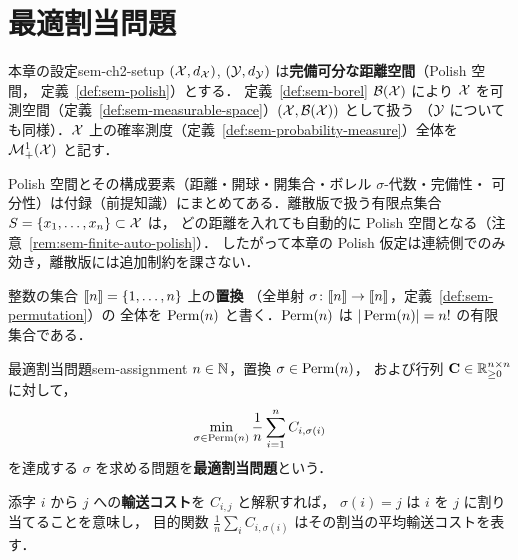 \chapter{最適割当問題}
\label{ch:sem-assignment-chapter}

\begin{remark}{本章の設定}{sem-ch2-setup}
  $(\mathcal{X}, d_{\mathcal{X}})$, $(\mathcal{Y}, d_{\mathcal{Y}})$ は\textbf{完備可分な距離空間}（Polish 空間，
  定義~\ref{def:sem-polish}）とする．
  定義~\ref{def:sem-borel} $\mathcal{B}(\mathcal{X})$ により
  $\mathcal{X}$ を可測空間（定義~\ref{def:sem-measurable-space}）$(\mathcal{X}, \mathcal{B}(\mathcal{X}))$ として扱う
  （$\mathcal{Y}$ についても同様）．$\mathcal{X}$ 上の確率測度（定義~\ref{def:sem-probability-measure}）全体を $\mathcal{M}_+^1(\mathcal{X})$ と記す．

  Polish 空間とその構成要素（距離・開球・開集合・ボレル $\sigma$-代数・完備性・
  可分性）は付録（前提知識）にまとめてある．離散版で扱う有限点集合 $S = \{x_1, \ldots, x_n\} \subset \mathcal{X}$ は，
  どの距離を入れても自動的に Polish 空間となる（注意~\ref{rem:sem-finite-auto-polish}）．
  したがって本章の Polish 仮定は連続側でのみ効き，離散版には追加制約を課さない．
\end{remark}

整数の集合 $\llbracket n \rrbracket = \{1, \ldots, n\}$ 上の\textbf{置換}
（全単射 $\sigma \colon \llbracket n \rrbracket \to \llbracket n \rrbracket$，定義~\ref{def:sem-permutation}）の
全体を $\operatorname{Perm}(n)$ と書く．$\operatorname{Perm}(n)$ は $|\operatorname{Perm}(n)| = n!$ の有限集合である．

\begin{definition}{最適割当問題}{sem-assignment}
  $n \in \mathbb{N}$，置換 $\sigma \in \operatorname{Perm}(n)$，
  および行列 $\mathbf{C} \in \mathbb{R}_{\geq 0}^{n \times n}$ に対して，
  \[
    \min_{\sigma \in \operatorname{Perm}(n)} \frac{1}{n} \sum_{i=1}^{n} C_{i, \sigma(i)}
  \]
  を達成する $\sigma$ を求める問題を\textbf{最適割当問題}という．
\end{definition}

添字 $i$ から $j$ への\textbf{輸送コスト}を $C_{i,j}$ と解釈すれば，
$\sigma(i) = j$ は $i$ を $j$ に割り当てることを意味し，
目的関数 $\frac{1}{n}\sum_i C_{i, \sigma(i)}$ はその割当の平均輸送コストを表す．

